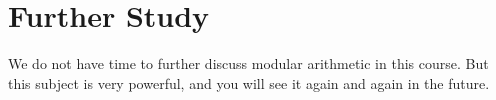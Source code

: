 \documentclass[a4paper,10pt]{report}
\begin{document}
\section{Further Study}

We do not have time to further discuss modular arithmetic in this course. But
this subject is very powerful, and you will see it again and again in the
future.

\printglossaries

\cleardoublepage
{}
\listoffigures
\end{document}
